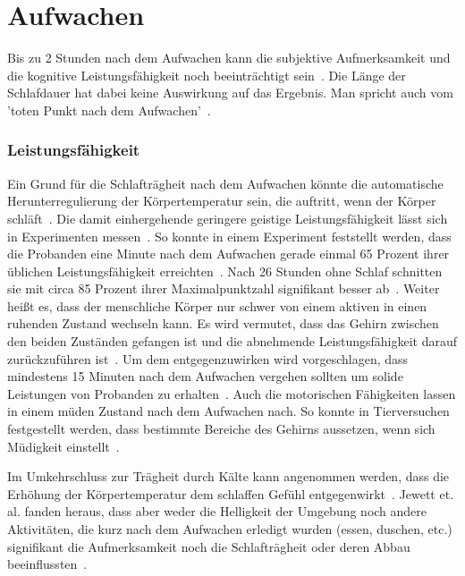 \section{Aufwachen}\label{sec:relatedWork.aufwachen}

Bis zu 2 Stunden nach dem Aufwachen kann die subjektive Aufmerksamkeit und die kognitive Leistungsfähigkeit noch beeinträchtigt sein~\cite{jewett1999time, online:muedesGehirn}. 
Die Länge der Schlafdauer hat dabei keine Auswirkung auf das Ergebnis. Man spricht auch vom 'toten Punkt nach dem Aufwachen'~\cite{online:muedesGehirn}. 

\subsubsection{Leistungsfähigkeit}

Ein Grund für die Schlafträgheit nach dem Aufwachen könnte die automatische Herunterregulierung der Körpertemperatur sein, die auftritt, wenn der Körper schläft~\cite{dinges1990you}. Die damit einhergehende geringere geistige Leistungsfähigkeit lässt sich in Experimenten messen~\cite{dinges1990you,wilkinson1971performance, online:muedesGehirn, online:muede, online:uebermuedetesHirn}. 
So konnte in einem Experiment feststellt werden, dass die Probanden eine Minute nach dem Aufwachen gerade einmal 65 Prozent ihrer üblichen Leistungsfähigkeit erreichten~\cite{online:muedesGehirn}. Nach 26 Stunden ohne Schlaf schnitten sie mit circa 85 Prozent ihrer Maximalpunktzahl signifikant besser ab~\cite{online:muedesGehirn}. 
Weiter heißt es, dass der menschliche Körper nur schwer von einem aktiven in einen ruhenden Zustand wechseln kann. Es wird vermutet, dass das Gehirn zwischen den beiden Zuständen gefangen ist und die abnehmende Leistungsfähigkeit darauf zurückzuführen ist~\cite{online:muede}.
Um dem entgegenzuwirken wird vorgeschlagen, dass mindestens 15 Minuten nach dem Aufwachen vergehen sollten um solide Leistungen von Probanden zu erhalten~\cite{wilkinson1971performance}.
Auch die motorischen Fähigkeiten lassen in einem müden Zustand nach dem Aufwachen nach. So konnte in Tierversuchen festgestellt werden, dass bestimmte Bereiche des Gehirns aussetzen, wenn sich Müdigkeit einstellt~\cite{online:uebermuedetesHirn}.

Im Umkehrschluss zur Trägheit durch Kälte kann angenommen werden, dass die Erhöhung der Körpertemperatur dem schlaffen Gefühl entgegenwirkt~\cite{jewett1999time}.
Jewett et. al. fanden heraus, dass aber weder die Helligkeit der Umgebung noch andere Aktivitäten, die kurz nach dem Aufwachen erledigt wurden (essen, duschen, etc.) signifikant die Aufmerksamkeit noch die Schlafträgheit oder deren Abbau beeinflussten~\cite{jewett1999time}.

